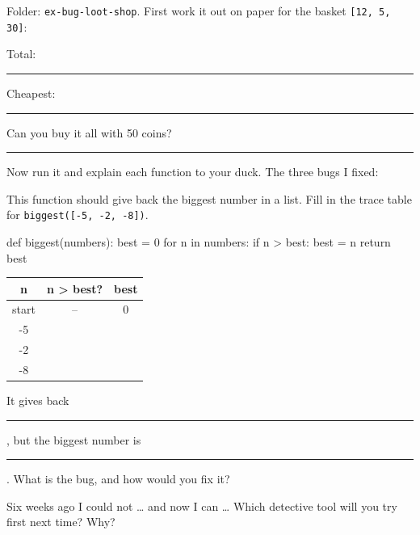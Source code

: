 \begin{exercise}
Folder: \texttt{ex-bug-loot-shop}. First work it out on paper for the basket \texttt{[12, 5, 30]}:\par
Total: \rule{1.5cm}{0.4pt}\quad Cheapest: \rule{1.5cm}{0.4pt}\quad Can you buy it all with 50 coins? \rule{1.5cm}{0.4pt}\par
Now run it and explain each function to your duck. The three bugs I fixed:
\end{exercise}

\begin{exercise}
This function should give back the biggest number in a list. Fill in the trace table for \texttt{biggest([-5, -2, -8])}.
\begin{center}
\begin{minipage}{0.45\linewidth}
\begin{pycode}
def biggest(numbers):
    best = 0
    for n in numbers:
        if n > best:
            best = n
    return best
\end{pycode}
\end{minipage}\hfill
\begin{minipage}{0.45\linewidth}
\renewcommand{\arraystretch}{1.4}
\begin{tabular}{|c|c|c|}
\hline \textbf{n} & \textbf{n > best?} & \textbf{best} \\ \hline
start & -- & 0 \\ \hline
-5 & & \\ \hline
-2 & & \\ \hline
-8 & & \\ \hline
\end{tabular}
\end{minipage}
\end{center}
It gives back \rule{1.5cm}{0.4pt}, but the biggest number is \rule{1.5cm}{0.4pt}. What is the bug, and how would you fix it?
\end{exercise}

\begin{vocab}
\end{vocab}

\begin{reflection}
Six weeks ago I could not \ldots{} and now I can \ldots
{}
Which detective tool will you try first next time? Why?
\end{reflection}
